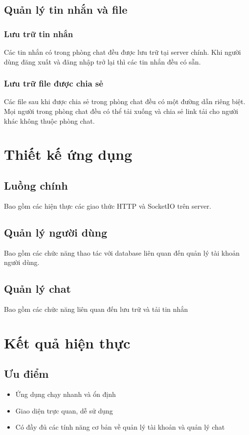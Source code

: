 \documentclass[a4paper]{article}
\begin{document}
	\subsection{Quản lý tin nhắn và file}
		\subsubsection{Lưu trữ tin nhắn}
		Các tin nhắn có trong phòng chat đều được lưu trữ tại server chính. Khi người dùng đăng xuất và đăng nhập trở lại thì các tin nhắn đều có sẵn.
		\subsubsection{Lưu trữ file được chia sẻ}
		Các file sau khi được chia sẻ trong phòng chat đều có một đường dẫn riêng biệt. Mọi người trong phòng chat đều có thể tải xuống và chia sẻ link tải cho người khác không thuộc phòng chat.
\section{Thiết kế ứng dụng}
	\subsection{Luồng chính}
		Bao gồm các hiện thực các giao thức HTTP và SocketIO trên server.
		
	\subsection{Quản lý người dùng}
		Bao gồm các chức năng thao tác với database liên quan đến quản lý tài khoản người dùng. 
		
	\subsection{Quản lý chat}
		Bao gồm các chức năng liên quan đến lưu trữ và tải tin nhắn
		
\section{Kết quả hiện thực}
	\subsection{Ưu điểm}
		\begin{itemize}
			\item Ứng dụng chạy nhanh và ổn định
			\item Giao diện trực quan, dễ sử dụng
			\item Có đầy đủ các tính năng cơ bản về quản lý tài khoản và quản lý chat
		\end{itemize}
		
\end{document}

